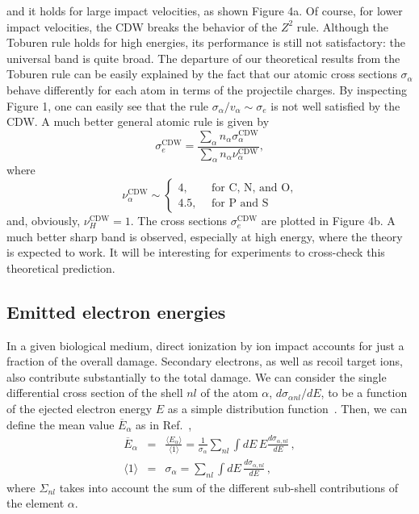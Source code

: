 \documentclass[preprint,12pt]{article}
\begin{document}
and it holds for large impact velocities, as shown Figure 4a.
Of course, for lower impact velocities, the CDW breaks the behavior of 
the $Z^{2}$ rule. Although the Toburen rule holds for high energies, 
its performance is still not satisfactory: the universal band is quite 
broad. The departure of our theoretical 
results from the Toburen rule can be easily explained by the fact that 
our atomic cross sections $\sigma_{\alpha}$ behave differently for 
each atom in terms of the projectile charges. By inspecting Figure 1, 
one can easily see that the rule $\sigma_{\alpha}/v_{\alpha}\sim
\sigma_{e}$ is not well satisfied by the CDW. A much better general 
atomic rule is given by
\begin{equation}
\sigma_{e}^{\text{CDW}}=\frac{\sum\limits_{\alpha}
n_{\alpha}\sigma_{\alpha}^{\text{CDW}}}{\sum\limits_{\alpha}n_{\alpha}
\nu_{\alpha}^{\text{CDW}}},
\label{32} 
\end{equation}
where 
\begin{equation}
\nu_{\alpha }^{\text{CDW}} \sim\left\{ 
\begin{array}{ll}
4,\ \ \  & \text{for C, N, and O,} \\ 
4.5,\ \  & \text{for P and S}
\end{array}
\right. 
\label{35}
\end{equation}
and, obviously, $\nu_{H}^{\text{CDW}}=1$. The cross sections 
$\sigma_{e}^{\text{CDW}}$ 
are plotted in Figure 4b. A much better sharp band is observed, 
especially at high energy, where the theory is expected to work. It 
will be interesting for experiments to cross-check this theoretical 
prediction.

\subsection{Emitted electron energies}

In a given biological medium, direct ionization by ion impact accounts 
for just a fraction of the overall damage. Secondary electrons, as well 
as recoil target ions, also contribute substantially to the total damage. 
We can consider the single differential cross section of the shell 
$nl$ of the atom $\alpha$, $d\sigma _{\alpha nl}/dE$, to be a function 
of the ejected electron energy $E$ as a simple distribution 
function~\cite{surdutovic2018}. Then, we can define the mean value 
$\overline{E}_{\alpha}$ as in Ref.~\cite{abril2015},
\begin{eqnarray}
\overline{E}_{\alpha} &=&\frac{\langle E_{\alpha}\rangle}{\langle
1\rangle}=\frac{1}{\sigma_{\alpha}}\sum\limits_{nl}\int dE\,E
\frac{d\sigma_{\alpha,nl}}{dE}\,,  
\label{40} \\
\langle 1\rangle &=&\sigma_{\alpha}=\sum\limits_{nl}\int dE\,
\frac{d\sigma_{\alpha,nl}}{dE}\,,  
\label{50}
\end{eqnarray}
where $\Sigma_{nl}$ takes into account the sum of the different 
sub-shell contributions of the element $\alpha$.
\end{document}
